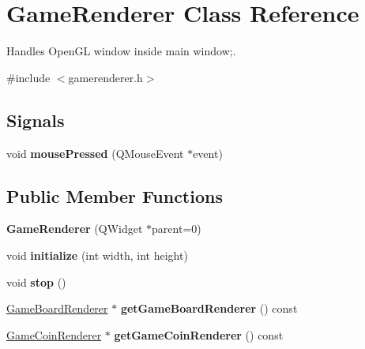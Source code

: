 \hypertarget{classGameRenderer}{\section{\-Game\-Renderer \-Class \-Reference}
\label{classGameRenderer}
}


\-Handles \-Open\-G\-L window inside main window;.  




{\ttfamily \#include $<$gamerenderer.\-h$>$}

\subsection*{\-Signals}
\begin{DoxyCompactItemize}
\item 
\hypertarget{classGameRenderer_aff73192b784fa17d2b11c28aa1635f20}{void {\bfseries mouse\-Pressed} (\-Q\-Mouse\-Event $\ast$event)}\label{classGameRenderer_aff73192b784fa17d2b11c28aa1635f20}

\end{DoxyCompactItemize}
\subsection*{\-Public \-Member \-Functions}
\begin{DoxyCompactItemize}
\item 
\hypertarget{classGameRenderer_a58bc8828909b59c2516549cf3a978f52}{{\bfseries \-Game\-Renderer} (\-Q\-Widget $\ast$parent=0)}\label{classGameRenderer_a58bc8828909b59c2516549cf3a978f52}

\item 
\hypertarget{classGameRenderer_a82019f8ae05f9ecfd4c2aec279ed9dec}{void {\bfseries initialize} (int width, int height)}\label{classGameRenderer_a82019f8ae05f9ecfd4c2aec279ed9dec}

\item 
\hypertarget{classGameRenderer_af733aa31dd1ace11b9a9b489f5e70573}{void {\bfseries stop} ()}\label{classGameRenderer_af733aa31dd1ace11b9a9b489f5e70573}

\item 
\hypertarget{classGameRenderer_a929f075483f98a51f71051777d8e6f8f}{\hyperlink{classGameBoardRenderer}{\-Game\-Board\-Renderer} $\ast$ {\bfseries get\-Game\-Board\-Renderer} () const }\label{classGameRenderer_a929f075483f98a51f71051777d8e6f8f}

\item 
\hypertarget{classGameRenderer_a5c90477c42380849ef0be29dbe548396}{\hyperlink{classGameCoinRenderer}{\-Game\-Coin\-Renderer} $\ast$ {\bfseries get\-Game\-Coin\-Renderer} () const }\label{classGameRenderer_a5c90477c42380849ef0be29dbe548396}

\end{DoxyCompactItemize}
